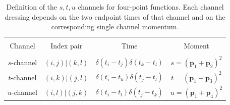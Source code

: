 \documentclass[reprint,english,superscriptaddress,preprintnumbers,amsmath,amssymb,aps,prd]{revtex4-1}
\begin{document}
%
\begin{table}[t]
    \begin{center}
    \centering
    \begin{tabular}{c|c|c|c}
      \hline\hline & & &   \\[-2ex]   
      Channel & Index pair & Time & Moment   \\[1ex]
      \hline & & &   \\[-2ex]
      \quad $s$-channel \quad\quad  & \quad $(i,j)|(k,l)$ \quad\quad  & \quad $\delta(t_i-t_j)\delta(t_k-t_l)$ \quad\quad  & \quad $s=\left(\boldsymbol{p}_{1}+\boldsymbol{p}_{2}\right)^{2}$ \quad\quad \\[1ex]
      \quad $t$-channel \quad\quad  & \quad $(i,k)|(j,l)$ \quad\quad  & \quad $\delta(t_i-t_k)\delta(t_j-t_l)$ \quad\quad  & \quad $t=\left(\boldsymbol{p}_{1}+\boldsymbol{p}_{3}\right)^{2}$ \quad\quad \\[1ex]
      \quad $u$-channel \quad\quad  & \quad $(i,l)|(j,k)$ \quad\quad  & \quad $\delta(t_i-t_l)\delta(t_j-t_k)$ \quad\quad  & \quad $u=\left(\boldsymbol{p}_{1}+\boldsymbol{p}_{4}\right)^{2}$ \quad\quad \\[1ex]
      \hline\hline
    \end{tabular}
    \caption{Definition of the $s,t,u$ channels for four-point functions. Each channel dressing depends on the two endpoint times of that channel and on the corresponding single channel momentum.}
    \label{tab:stu}
    \end{center}\vspace{-0.5cm}
\end{table}
%
\end{document}
